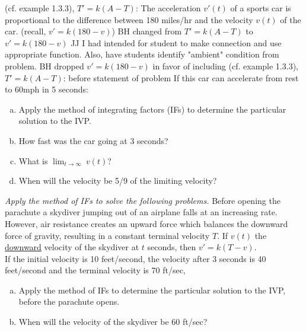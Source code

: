 \documentclass[12pt]{book}
\begin{document}

\begin{exercise}
{\color{blue}
(cf. example 1.3.3), $T' = k(A-T)$:}
The acceleration $v'(t)$ of a sports car is proportional to the difference between 180 miles/hr and the velocity $v(t)$ of the car.
{\color{red}
(recall, $v' = k(180-v)$)
}
{\color{teal}BH changed from $T'=k(A-T)$ to $v' = k(180-v)$
JJ I had intended for student to make connection and
use appropriate function. Also, have students
identify "ambient" condition from problem.
BH dropped $v' = k(180-v)$ in favor of including
(cf. example 1.3.3), $T' = k(A-T)$: before statement of problem
}
If this car can accelerate from rest to 60mph in 5 seconds:
\begin{enumerate}[a)]
    \item Apply the method of integrating factors (IFs) to determine the particular solution to the IVP.
    \item How fast was the car going at 3 seconds?
    \item What is $\displaystyle{\lim_{t\to\infty}}\ v(t)$?
    \item When will the velocity be 5/9 of the limiting velocity?
\end{enumerate}
\end{exercise}

\vspace{3mm}



\begin{exercise}
\textit{Apply the method of IFs to solve the following problems.}
Before opening the parachute a skydiver jumping out of an airplane falls at an increasing rate.
However, air resistance creates an upward force which balances the downward force of gravity, 
resulting in a constant terminal velocity $T$. If $v(t)$ the \underline{downward} velocity of the 
skydiver at $t$ seconds, then $v' = k(T-v)$.\\
If the initial velocity is 10 feet/second, the velocity after 3 seconds is 40 feet/second and
the terminal velocity is 70 ft/sec,
\begin{enumerate}[a)]
    \item Apply the method of IFs to determine the particular solution to the IVP, before the parachute opens.
    \item When will the velocity of the skydiver be 60 ft/sec?
\end{enumerate}

\end{exercise}
\end{document}
